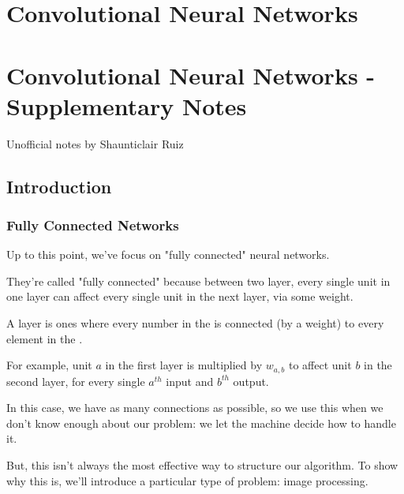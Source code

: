 \chapter{Convolutional Neural Networks}


 
 
 




\setcounter{chapter}{6}

\chapter{Convolutional Neural Networks - Supplementary Notes}

Unofficial notes by Shaunticlair Ruiz


\section{Introduction}

    \subsection{Fully Connected Networks}

        Up to this point, we've focus on "fully connected" neural networks. 
        
        They're called "fully connected" because between two layer, every single unit in one layer can affect every single unit in the next layer, via some weight.\\
        
        \begin{definition}
            A  layer is ones where every number in the  is connected (by a weight) to every element in the . 
        \end{definition}
        
        For example, unit $a$ in the first layer is multiplied by $w_{a,b}$ to affect unit $b$ in the second layer, for every single $a^{th}$ input and $b^{th}$ output.
        
        In this case, we have as many connections as possible, so we use this when we don't know enough about our problem: we let the machine decide how to handle it.
        
        But, this isn't always the most effective way to structure our algorithm. To show why this is, we'll introduce a particular type of problem: image processing. 
    
